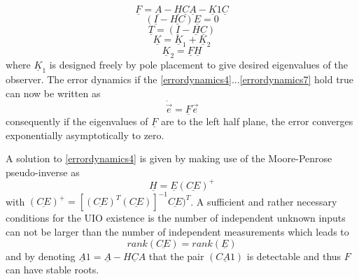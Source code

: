%
\begin{equation}
\underline F = \underline A-\underline H \underline C \underline A-\underline K1 \underline C
\label{errordynamics3}
\end{equation}
\begin{equation}
(\underline I - \underline{HC})\underline E = 0
\label{errordynamics4}
\end{equation}
\begin{equation}
\underline T = (\underline I - \underline H\underline C)
\label{errordynamics5}
\end{equation}
\begin{equation}
\underline K = \underline K_{1} +\underline K_{2}
\label{errordynamics6}
\end{equation}
\begin{equation}
\underline K_{2} =\underline F \underline H 
\label{errordynamics7}
\end{equation}
where $\underline K_{1}$ is designed freely by pole placement to give desired eigenvalues of the observer. The error dynamics if the \ref{errordynamics4}...\ref{errordynamics7} hold true can now be written as 
\begin{equation}
\dot{\vec{e}} = \underline F \vec{e}
\label{errordynamics8}
\end{equation}
consequently if the eigenvalues of $\underline F$ are to the left half plane, the error converges exponentially asymptotically to zero. 

A solution to \eqref{errordynamics4} is given by making use of the Moore-Penrose pseudo-inverse as
\begin{equation}
\underline H = \underline E (\underline{CE})^{+}
\label{errordynamics9}
\end{equation}
with $(\underline{CE})^{+} = [(\underline{CE})^{T} (\underline{CE})]^{-1}\underline{CE})^{T} $.
A sufficient and rather necessary conditions for the UIO existence is the number of independent unknown inputs can not be larger than the number of independent measurements which leads to
\begin{equation}
rank (\underline{CE}) =rank( \underline E) 
\label{errordynamics10}
\end{equation}
and by denoting $\underline A1 = \underline A - \underline{HCA} $ that the pair $(\underline {CA1})$ is detectable and thus $F$ can have stable roots.
